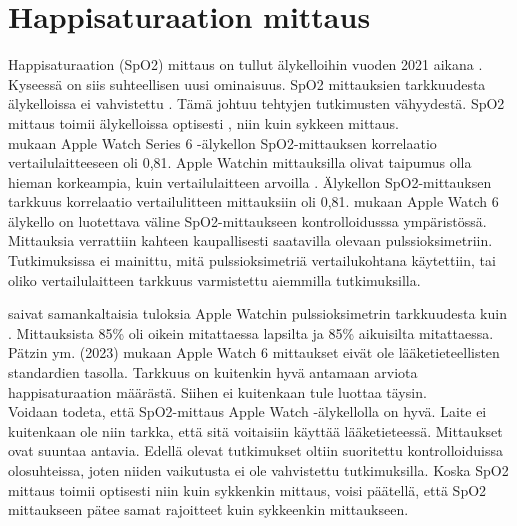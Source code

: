 \documentclass[utf8,bachelor,finnish]{bachelor}
\begin{document}
  \section{Happisaturaation mittaus}
  Happisaturaation (SpO2) mittaus on tullut älykelloihin vuoden 2021 aikana \parencite{zhang_can_2022}. Kyseessä on siis suhteellisen uusi ominaisuus.
   SpO2 mittauksien tarkkuudesta älykelloissa ei vahvistettu \parencite{zhang_can_2022}. Tämä johtuu tehtyjen tutkimusten vähyydestä.
    SpO2 mittaus toimii älykelloissa optisesti \parencite{windisch_accuracy_2023}, niin kuin sykkeen mittaus.\\
    
  \textcite{pipek_comparison_2021} mukaan Apple Watch Series 6 -älykellon SpO2-mittauksen korrelaatio vertailulaitteeseen oli 0,81.
   Apple Watchin mittauksilla olivat taipumus olla hieman korkeampia, kuin vertailulaitteen arvoilla \parencite{pipek_comparison_2021}.
    Älykellon SpO2-mittauksen tarkkuus korrelaatio vertailulitteen mittauksiin oli 0,81.
     \textcite{pipek_comparison_2021} mukaan Apple Watch 6 älykello on luotettava väline SpO2-mittaukseen kontrolloidusssa ympäristössä.
      Mittauksia verrattiin kahteen kaupallisesti saatavilla olevaan pulssioksimetriin.
       Tutkimuksissa ei mainittu, mitä pulssioksimetriä vertailukohtana käytettiin, tai oliko vertailulaitteen tarkkuus varmistettu aiemmilla tutkimuksilla.
   
  \textcite{patz_accuracy_2023} saivat samankaltaisia tuloksia Apple Watchin pulssioksimetrin tarkkuudesta kuin \textcite{pipek_comparison_2021}. Mittauksista 85\%
   oli oikein mitattaessa lapsilta ja 85\% aikuisilta mitattaessa. Pätzin ym. (2023) mukaan Apple Watch 6 mittaukset eivät ole
    lääketieteellisten standardien tasolla. Tarkkuus on kuitenkin hyvä antamaan arviota happisaturaation määrästä.
     Siihen ei kuitenkaan tule luottaa täysin.\\

    Voidaan todeta, että SpO2-mittaus Apple Watch -älykellolla on hyvä. Laite ei kuitenkaan ole niin tarkka, että sitä voitaisiin käyttää
     lääketieteessä. Mittaukset ovat suuntaa antavia. Edellä olevat tutkimukset oltiin suoritettu kontrolloiduissa olosuhteissa, joten niiden vaikutusta ei ole vahvistettu tutkimuksilla.
      Koska SpO2 mittaus toimii optisesti niin kuin sykkenkin mittaus, voisi päätellä, että SpO2 mittaukseen pätee samat rajoitteet kuin sykkeenkin mittaukseen. \\

      
    
\end{document}
